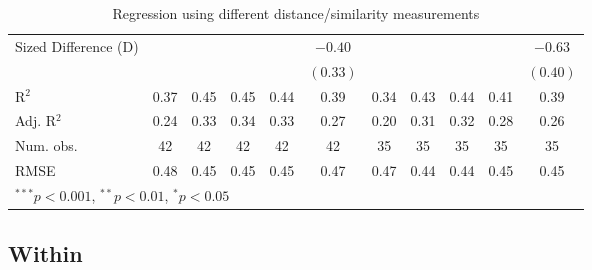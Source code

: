 \documentclass[
]{article}
\begin{document}
\begin{landscape}
\begin{table}
\begin{center}
\begin{tabular}{l c c c c c c c c c c }
\quad Sized Difference (D) &             &              &             &              & $-0.40$     &             &              &             &             & $-0.63$     \\
                           &             &              &             &              & $(0.33)$    &             &              &             &             & $(0.40)$    \\
\hline
R$^2$                      & 0.37        & 0.45         & 0.45        & 0.44         & 0.39        & 0.34        & 0.43         & 0.44        & 0.41        & 0.39        \\
Adj. R$^2$                 & 0.24        & 0.33         & 0.34        & 0.33         & 0.27        & 0.20        & 0.31         & 0.32        & 0.28        & 0.26        \\
Num. obs.                  & 42          & 42           & 42          & 42           & 42          & 35          & 35           & 35          & 35          & 35          \\
RMSE                       & 0.48        & 0.45         & 0.45        & 0.45         & 0.47        & 0.47        & 0.44         & 0.44        & 0.45        & 0.45        \\
\hline
\multicolumn{11}{l}{\scriptsize{$^{***}p<0.001$, $^{**}p<0.01$, $^*p<0.05$}}
\end{tabular}
\caption{Regression using different distance/similarity measurements}
\label{table:coefficients}
\end{center}
\end{table}

\end{landscape}

\clearpage

\normalsize

\hypertarget{within}{%
\subsection{Within}\label{within}}

\clearpage
\end{document}
